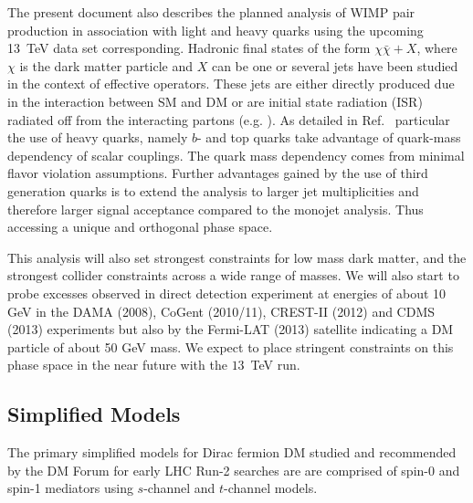 

The present document also describes the planned analysis of WIMP pair production in association with light and heavy quarks using the upcoming 13~TeV data set corresponding. 
Hadronic final states of the form $\chi \bar \chi + X$, where $\chi$ is the dark matter particle and $X$ can be one or several jets have been studied in the context of effective operators. These jets are either directly produced due in the interaction between SM and DM or are initial state radiation (ISR)  radiated off from the interacting partons (e.g. \cite{Goodman:2010yf,Fox:2011pm,Petriello:2008pu,Fox:2011fx}). As detailed in Ref.~\cite{Lin:2013sca, Artoni:2013zba} particular the use of heavy quarks, namely $b$- and top quarks take advantage of quark-mass dependency of scalar couplings. The quark mass dependency comes from minimal flavor violation assumptions. Further advantages gained by the use of third generation quarks is to extend the analysis to larger jet multiplicities and therefore larger signal acceptance compared to the monojet analysis. Thus accessing a unique and orthogonal phase space. 


This analysis will also set strongest constraints for low mass dark matter, and the strongest collider constraints across a wide range of masses. We will also start to probe excesses observed in direct detection experiment at energies of about 10 GeV in the DAMA (2008), CoGent (2010/11), CREST-II (2012) and CDMS (2013) experiments but also by the Fermi-LAT (2013) satellite indicating a DM particle of about 50 GeV mass. We expect to place stringent constraints on this phase space in the near future with the $13$~TeV run.




\subsection{Simplified Models}


The primary simplified models for Dirac fermion DM studied and recommended by the DM Forum for early LHC Run-2 searches are
are comprised of spin-0 and spin-1 mediators using $s$-channel and $t$-channel models.


